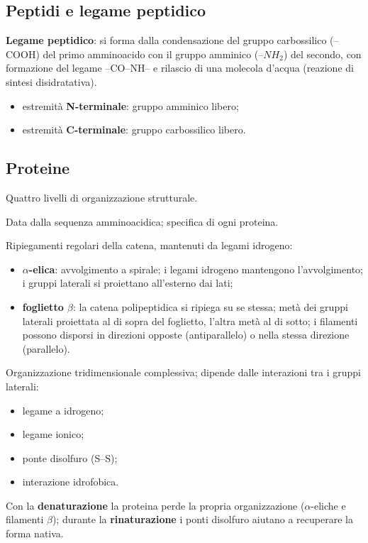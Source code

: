 \subsection{Peptidi e legame peptidico}

\textbf{Legame peptidico}: si forma dalla condensazione del gruppo carbossilico (--COOH) del primo amminoacido con il gruppo amminico (--$NH_2$) del secondo, con formazione del legame --CO--NH-- e rilascio di una molecola d'acqua (reazione di sintesi disidratativa).
\begin{itemize}
  \item estremità \textbf{N-terminale}: gruppo amminico libero;
  \item estremità \textbf{C-terminale}: gruppo carbossilico libero.
\end{itemize}

\subsection{Proteine}

Quattro livelli di organizzazione strutturale.

Data dalla sequenza amminoacidica; specifica di ogni proteina.

Ripiegamenti regolari della catena, mantenuti da legami idrogeno:
\begin{itemize}
  \item \textbf{$\alpha$-elica}: avvolgimento a spirale; i legami idrogeno mantengono l'avvolgimento; i gruppi laterali si proiettano all'esterno dai lati;
  \item \textbf{foglietto $\beta$}: la catena polipeptidica si ripiega su se stessa; metà dei gruppi laterali proiettata al di sopra del foglietto, l'altra metà al di sotto; i filamenti possono disporsi in direzioni opposte (antiparallelo) o nella stessa direzione (parallelo).
\end{itemize}

Organizzazione tridimensionale complessiva; dipende dalle interazioni tra i gruppi laterali:
\begin{itemize}
  \item legame a idrogeno;
  \item legame ionico;
  \item ponte disolfuro (S--S);
  \item interazione idrofobica.
\end{itemize}
Con la \textbf{denaturazione} la proteina perde la propria organizzazione ($\alpha$-eliche e filamenti $\beta$); durante la \textbf{rinaturazione} i ponti disolfuro aiutano a recuperare la forma nativa.

